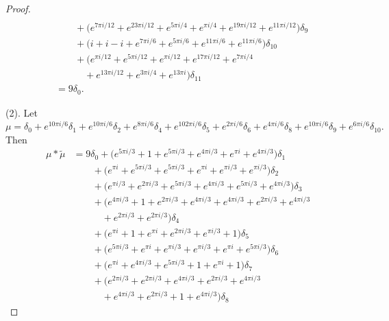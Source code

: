 \begin{proof}
\begin{align*}
\\&\qquad  +  \big( e^{ 7 \pi i / 12}+ e^{ 23 \pi i / 12}+ e^{ 5 \pi i / 4}+ e^{\pi i / 4}+ e^{ 19 \pi i / 12}+ e^{ 11 \pi i / 12}\big)\delta_{9} 
\\&\qquad  +  \big(  i +  i - i+ e^{ 7 \pi i / 6}+ e^{ 5 \pi i / 6}+ e^{ 11 \pi i / 6}+ e^{ 11 \pi i / 6}\big)\delta_{10} 
\\&\qquad  +  \big( e^{\pi i / 12}+ e^{ 5 \pi i / 12}+ e^{\pi i / 12}+ e^{ 17 \pi i / 12}+ e^{ 7 \pi i / 4}
\\&\quad\qquad+ e^{ 13 \pi i / 12}+ e^{ 3 \pi i / 4}+ e^{ 13 \pi i}\big)\delta_{11} 
\\&=9\delta_0.
\end{align*}

(2).  Let $  
\mu = \delta_{0}  +   e^{ 10\pi i  / 6}\delta_{1}  +   e^{ 10\pi i  / 6}\delta_{2}  +   e^{ 8\pi i  / 6}\delta_{4}  +   e^{ 102\pi i  / 6}\delta_{5}  +   e^{ 2\pi i  / 6}\delta_{6}  +   e^{ 4\pi i  / 6}\delta_{8}  +   e^{ 10\pi i  / 6}\delta_{9}  +   e^{ 6\pi i  / 6}\delta_{10}
.$
  Then
\begin{align*}\mu * \tilde\mu&=    9\delta_{0}   +  \big( e^{ 5 \pi i / 3}+ 1+ e^{ 5 \pi i / 3}+ e^{ 4 \pi i / 3}+ e^{\pi  i}+ e^{ 4 \pi i / 3}\big)\delta_{1} \\&\qquad  +  \big( e^{\pi  i}+ e^{ 5 \pi i / 3}+ e^{ 5 \pi i / 3}+ e^{\pi  i}+ e^{\pi i / 3}+ e^{\pi i / 3}\big)\delta_{2} 
\\&\qquad  +  \big( e^{\pi i / 3}+ e^{ 2 \pi i / 3}+ e^{ 5 \pi i / 3}+ e^{ 4 \pi i / 3}+ e^{ 5 \pi i / 3}+ e^{ 4 \pi i / 3}\big)\delta_{3} \\&\qquad  +  \big( e^{ 4 \pi i / 3}+ 1+ e^{ 2 \pi i / 3}+ e^{ 4 \pi i / 3}+ e^{ 4 \pi i / 3}+ e^{ 2 \pi i / 3}+ e^{ 4 \pi i / 3}
\\& \quad\qquad + e^{ 2 \pi i / 3}+ e^{ 2 \pi i / 3}\big)\delta_{4} 
\\&\qquad  +  \big( e^{\pi  i}+ 1+ e^{\pi  i}+ e^{ 2 \pi i / 3}+ e^{\pi i / 3}+ 1\big)\delta_{5} \\&\qquad  +  \big( e^{ 5 \pi i / 3}+ e^{\pi  i}+ e^{\pi i / 3}+ e^{\pi i / 3}+ e^{\pi  i}+ e^{ 5 \pi i / 3}\big)\delta_{6} 
\\&\qquad  +  \big( e^{\pi  i}+ e^{ 4 \pi i / 3}+ e^{ 5 \pi i / 3}+ 1+ e^{\pi  i}+ 1\big)\delta_{7} \\&\qquad  +  \big( e^{ 2 \pi i / 3}+ e^{ 2 \pi i / 3}+ e^{ 4 \pi i / 3}+ e^{ 2 \pi i / 3}+ e^{ 4 \pi i / 3}\\& \quad\qquad + e^{ 4 \pi i / 3}+ e^{ 2 \pi i / 3}+ 1+ e^{ 4 \pi i / 3}\big)\delta_{8} 

\end{align*}
\end{proof}
